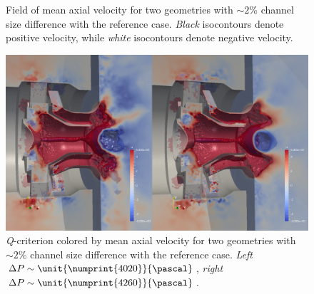 \begin{figure}[!h]
\centering
\caption{Field of mean axial velocity for two geometries with $\sim2$\% channel size difference with the reference case. \emph{Black} isocontours denote positive velocity, while \emph{white} isocontours denote negative velocity.}
\label{fig:swirler_mod_u}
\end{figure}

\begin{figure}[!h]
\centering
\includegraphics[width=\linewidth,keepaspectratio]{fig/applications/swirler/recirculation_base-mod.png}
\caption{\emph{Q}-criterion colored by mean axial velocity for two geometries with $\sim2$\% channel size difference with the reference case. \emph{Left} $\Delta P \sim \unit{\numprint{4020}}{\pascal}$, \emph{right} $\Delta P \sim \unit{\numprint{4260}}{\pascal}$.}
\label{fig:swirler_mod_u_3d}
\end{figure}


